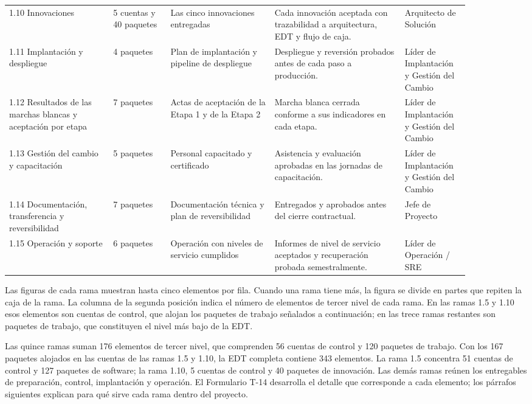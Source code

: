 \documentclass[11pt]{article}
\begin{document}
\begin{longtable}{p{0.2\linewidth}p{0.11\linewidth}p{0.2\linewidth}p{0.25\linewidth}p{0.12\linewidth}}
1.10 Innovaciones & 5 cuentas y 40 paquetes & Las cinco innovaciones entregadas & Cada innovación aceptada con trazabilidad a arquitectura, EDT y flujo de caja. & Arquitecto de Solución \\
1.11 Implantación y despliegue & 4 paquetes & Plan de implantación y pipeline de despliegue & Despliegue y reversión probados antes de cada paso a producción. & Líder de Implantación y Gestión del Cambio \\
1.12 Resultados de las marchas blancas y aceptación por etapa & 7 paquetes & Actas de aceptación de la Etapa 1 y de la Etapa 2 & Marcha blanca cerrada conforme a sus indicadores en cada etapa. & Líder de Implantación y Gestión del Cambio \\
1.13 Gestión del cambio y capacitación & 5 paquetes & Personal capacitado y certificado & Asistencia y evaluación aprobadas en las jornadas de capacitación. & Líder de Implantación y Gestión del Cambio \\
1.14 Documentación, transferencia y reversibilidad & 7 paquetes & Documentación técnica y plan de reversibilidad & Entregados y aprobados antes del cierre contractual. & Jefe de Proyecto \\
1.15 Operación y soporte & 6 paquetes & Operación con niveles de servicio cumplidos & Informes de nivel de servicio aceptados y recuperación probada semestralmente. & Líder de Operación / SRE \\
\end{longtable}

Las figuras de cada rama muestran hasta cinco elementos por fila. Cuando una rama tiene más, la figura se divide en partes que repiten la caja de la rama. La columna de la segunda posición indica el número de elementos de tercer nivel de cada rama. En las ramas 1.5 y 1.10 esos elementos son cuentas de control, que alojan los paquetes de trabajo señalados a continuación; en las trece ramas restantes son paquetes de trabajo, que constituyen el nivel más bajo de la EDT.

Las quince ramas suman 176 elementos de tercer nivel, que comprenden 56 cuentas de control y 120 paquetes de trabajo. Con los 167 paquetes alojados en las cuentas de las ramas 1.5 y 1.10, la EDT completa contiene 343 elementos. La rama 1.5 concentra 51 cuentas de control y 127 paquetes de software; la rama 1.10, 5 cuentas de control y 40 paquetes de innovación. Las demás ramas reúnen los entregables de preparación, control, implantación y operación. El Formulario T-14 desarrolla el detalle que corresponde a cada elemento; los párrafos siguientes explican para qué sirve cada rama dentro del proyecto.
\end{document}
